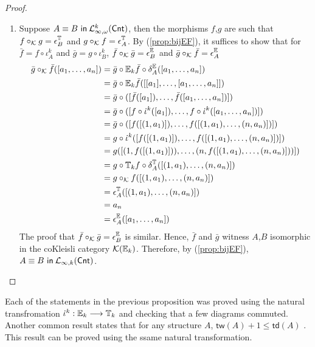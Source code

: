 \begin{prop}
\begin{proof}
\begin{enumerate}[label=(\arabic*)]
\item Suppose ${A \equiv B \ \mathsf{in}\: \mathcal{L}^{k}_{\infty,\omega}(\mathsf{Cnt})}$, then the morphisms $f$,$g$ are such that $f \circ_{\mathcal{K}} g = \epsilon^{{\mathbb{T}_{}}}_{B}$ and  $g \circ_{\mathcal{K}} f = \epsilon^{{\mathbb{T}_{}}}_{A}$. By (\ref{prop:bijEF}), it suffices to show that for $\bar{f} = f \circ \iota^{k}_{A}$ and $\bar{g} = g \circ \iota^{k}_{B}$, $\bar{f} \circ_{\mathcal{K}} \bar{g} = \epsilon^{{\mathbb{E}_{}}}_{B}$ and $\bar{g} \circ_{\mathcal{K}} \bar{f} = \epsilon^{{\mathbb{E}_{}}}_{A}$ 
\begin{align*}
\bar{g} \circ_{\mathcal{K}} \bar{f}([a_{1},\dots,a_{n}]) &= \bar{g} \circ \efcomonad{k}{\bar{f}} \circ \delta^{\efcomonad{}{}}_{A}([a_{1},\dots,a_{n}]) \\
&= \bar{g} \circ \efcomonad{k}{\bar{f}}([[a_{1}],\dots,[a_{1},\dots,a_{n}]]) \\
&= \bar{g} \circ ([\bar{f}([a_{1}]),\dots,\bar{f}([a_{1},\dots,a_{n}])]) \\
&= \bar{g} \circ ([f \circ \iota^{k}([a_{1}]),\dots,f \circ \iota^{k}([a_{1},\dots,a_{n}])]) \\
&= \bar{g} \circ ([f([(1,a_{1})]),\dots,f([(1,a_{1}),\dots,(n,a_{n})])]) \\
&= g \circ \iota^{k} ([f([(1,a_{1})]),\dots,f([(1,a_{1}),\dots,(n,a_{n})])]) \\
&= g ([(1,f([(1,a_{1})])),\dots,(n,f([(1,a_{1}),\dots,(n,a_{n})]))]) \\
&= g \circ \pcomonad{k}{f} \circ \delta^{\pcomonad{}{}}_{A}([(1,a_{1}),\dots,(n,a_{n})]) \\
&= g \circ_{\mathcal{K}} f([(1,a_{1}),\dots,(n,a_{n})]) \\
&= \epsilon^{\pcomonad{}{}}_{A}([(1,a_{1}),\dots,(n,a_{n})]) \\
&= a_{n} \\
&= \epsilon^{\efcomonad{}{}}_{A}([a_{1},\dots,a_{n}]) \\
\end{align*}
The proof that $\bar{f} \circ_{\mathcal{K}} \bar{g} = \epsilon^{{\mathbb{E}_{}}}_{B}$ is similar. Hence, $\bar{f}$ and $\bar{g}$ witness $A$,$B$ isomorphic in the coKleisli category $\mathcal{K}({\mathbb{E}_{k}})$. Therefore, by (\ref{prop:bijEF}), ${A \equiv B \ \mathsf{in}\: \mathcal{L}_{\infty,k}(\mathsf{Cnt})}$.
\end{enumerate}
\end{proof}
\label{prop:kRankToKVariable}
\end{prop}
Each of the statements in the previous proposition was proved using the natural transfromation $\iota^{k}:\efcomonad{k}{} \longrightarrow \pcomonad{k}{}$ and checking that a few diagrams commuted. Another common result states that for any structure $A$, $\mathsf{tw}(A) + 1 \leq \mathsf{td}(A)$ \cite{Bodlaender1995}. This result can be proved using the ssame natural transformation. 
